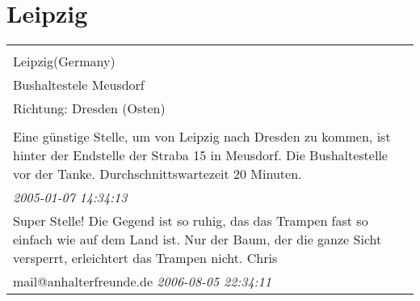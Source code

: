 \documentclass[a4paper,12pt]{article}
\begin{document}
\section{Leipzig}
\begin{tabular}{|p{13cm}|}
\hline\\
Leipzig(Germany)\\
Bushaltestele Meusdorf\\
Richtung: Dresden (Osten) \\
\hline\\
Eine günstige Stelle, um von Leipzig nach Dresden zu kommen, ist hinter der Endstelle der Straba 15 in Meusdorf. Die Bushaltestelle vor der Tanke. Durchschnittswartezeit 20 Minuten. \\
\textit{ 2005-01-07 14:34:13 }\\\hline Super Stelle!
Die Gegend ist so ruhig, das das Trampen fast so einfach wie auf dem Land ist.
Nur der Baum, der die ganze Sicht versperrt, erleichtert das Trampen nicht.
Chris \\
mail@anhalterfreunde.de \textit{ 2006-08-05 22:34:11 }\\\hline
\end{tabular}
\end{document}
